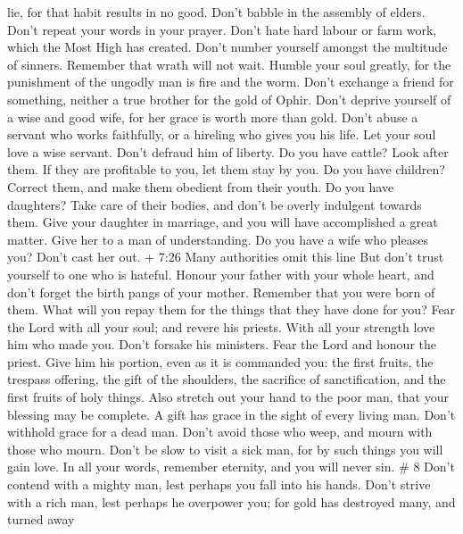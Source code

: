 lie, for that habit results in no good.  Don't babble in
the assembly of elders. Don't repeat your words in your prayer.
 Don't hate hard labour or farm work, which the Most High
has created.  Don't number yourself amongst the multitude
of sinners. Remember that wrath will not wait.  Humble your
soul greatly, for the punishment of the ungodly man is fire and the
worm.  Don't exchange a friend for something, neither a
true brother for the gold of Ophir.  Don't deprive yourself
of a wise and good wife, for her grace is worth more than gold.
 Don't abuse a servant who works faithfully, or a hireling
who gives you his life.  Let your soul love a wise servant.
Don't defraud him of liberty.  Do you have cattle? Look
after them. If they are profitable to you, let them stay by you.
 Do you have children? Correct them, and make them obedient
from their youth.  Do you have daughters? Take care of
their bodies, and don't be overly indulgent towards them. 
Give your daughter in marriage, and you will have accomplished a great
matter. Give her to a man of understanding.  Do you have a
wife who pleases you? Don't cast her out. + 7:26 Many authorities omit
this line But don't trust yourself to one who is hateful. 
Honour your father with your whole heart, and don't forget the birth
pangs of your mother.  Remember that you were born of them.
What will you repay them for the things that they have done for you?
 Fear the Lord with all your soul; and revere his priests.
 With all your strength love him who made you. Don't
forsake his ministers.  Fear the Lord and honour the
priest. Give him his portion, even as it is commanded you: the first
fruits, the trespass offering, the gift of the shoulders, the sacrifice
of sanctification, and the first fruits of holy things. 
Also stretch out your hand to the poor man, that your blessing may be
complete.  A gift has grace in the sight of every living
man. Don't withhold grace for a dead man.  Don't avoid
those who weep, and mourn with those who mourn.  Don't be
slow to visit a sick man, for by such things you will gain love.
 In all your words, remember eternity, and you will never
sin. \# 8  Don't contend with a mighty man, lest perhaps you
fall into his hands.  Don't strive with a rich man, lest
perhaps he overpower you; for gold has destroyed many, and turned away
